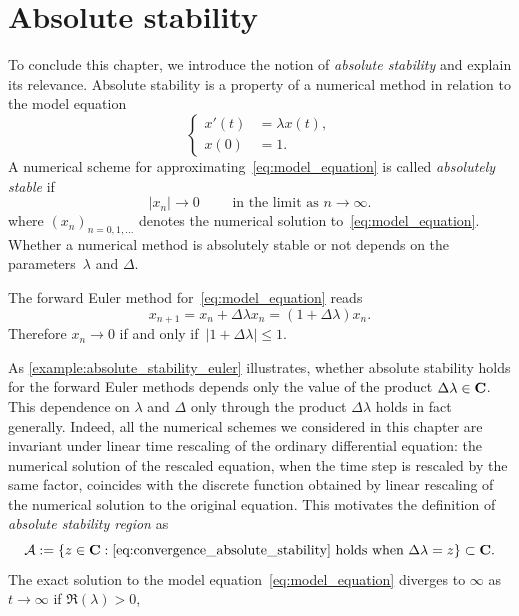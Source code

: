 \section{Absolute stability}
\label{sec:absolute_stability}
To conclude this chapter,
we introduce the notion of \emph{absolute stability} and explain its relevance.
Absolute stability is a property of a numerical method in relation to the model equation
\begin{equation}
    \label{eq:model_equation}
    \left\{
    \begin{aligned}
        x'(t) &= \lambda x(t), \\
        x(0) &= 1.
    \end{aligned}
    \right.
\end{equation}
A numerical scheme for approximating~\eqref{eq:model_equation} is called \emph{absolutely stable} if
\begin{equation}
    \label{eq:convergence_absolute_stability}
    \lvert x_n \rvert \to 0 \qquad \text{ in the limit as } n \to \infty.
\end{equation}
where $(x_n)_{n=0, 1, \dotsc}$ denotes the numerical solution to~\eqref{eq:model_equation}.
Whether a numerical method is absolutely stable or not depends on the parameters~$\lambda$ and $\Delta$.
\begin{example}
    \label{example:absolute_stability_euler}
    The forward Euler method for~\eqref{eq:model_equation} reads
    \[
        x_{n+1} = x_n + \Delta \lambda x_n = (1 + \Delta \lambda) x_n.
    \]
    Therefore $x_n \to 0$ if and only if~$|1 + \Delta \lambda| \leq 1$.
\end{example}
As \cref{example:absolute_stability_euler} illustrates,
whether absolute stability holds for the forward Euler methods depends only the value of the product $\Delta \lambda \in \mathbf C$.
This dependence on $\lambda$ and $\Delta$ only through the product $\Delta \lambda$ holds in fact generally.
Indeed, all the numerical schemes we considered in this chapter are invariant under linear time rescaling of the ordinary differential equation:
the numerical solution of the rescaled equation, when the time step is rescaled by the same factor,
coincides with the discrete function obtained by linear rescaling of the numerical solution to the original equation.
This motivates the definition of \emph{absolute stability region} as
\[
    \mathcal A := \{ z \in \mathbf C : \text{\eqref{eq:convergence_absolute_stability}  holds when $\Delta \lambda = z$} \} \subset \mathbf C.
\]
The exact solution to the model equation~\eqref{eq:model_equation} diverges to $\infty$ as $t \to \infty$ if $\Re(\lambda) > 0$,
